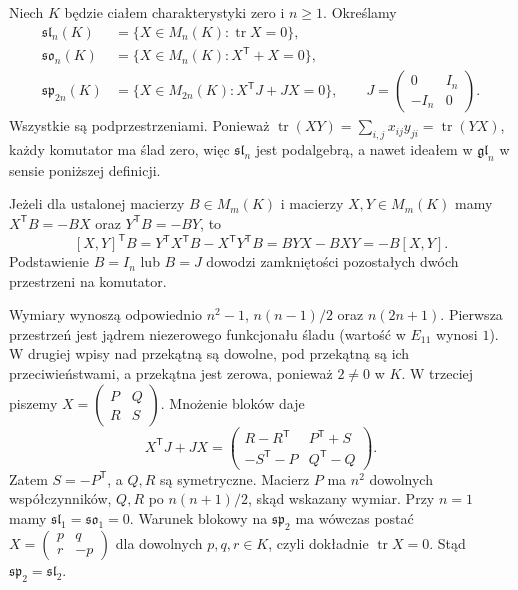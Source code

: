 \begin{przyklad}
\label{aa:prz:classical-lie}
Niech $K$ będzie ciałem charakterystyki zero
i $n\ge1$. Określamy
\[
\begin{aligned}
 \mathfrak{sl}_n(K)&=\{X\in M_n(K):\operatorname{tr}X=0\},\\
 \mathfrak{so}_n(K)&=\{X\in M_n(K):X^{\mathsf T}+X=0\},\\
 \mathfrak{sp}_{2n}(K)&=\{X\in M_{2n}(K):X^{\mathsf T}J+JX=0\},
 \qquad J=\begin{pmatrix}0&I_n\\-I_n&0\end{pmatrix}.
\end{aligned}
\]
Wszystkie są podprzestrzeniami. Ponieważ
$\operatorname{tr}(XY)=\sum_{i,j}x_{ij}y_{ji}
=\operatorname{tr}(YX)$, każdy komutator ma ślad zero,
więc $\mathfrak{sl}_n$ jest podalgebrą, a nawet
ideałem w $\mathfrak{gl}_n$ w sensie poniższej definicji.

Jeżeli dla ustalonej macierzy $B\in M_m(K)$ i macierzy
$X,Y\in M_m(K)$ mamy $X^{\mathsf T}B=-BX$ oraz
$Y^{\mathsf T}B=-BY$, to
\[
 [X,Y]^{\mathsf T}B
 =Y^{\mathsf T}X^{\mathsf T}B-X^{\mathsf T}Y^{\mathsf T}B
 =BYX-BXY=-B[X,Y].
\]
Podstawienie $B=I_n$ lub $B=J$ dowodzi zamkniętości
pozostałych dwóch przestrzeni na komutator.

Wymiary wynoszą odpowiednio $n^2-1$, $n(n-1)/2$
oraz $n(2n+1)$. Pierwsza przestrzeń jest jądrem
niezerowego funkcjonału śladu (wartość w $E_{11}$
wynosi $1$). W drugiej wpisy nad przekątną są dowolne,
pod przekątną są ich przeciwieństwami, a przekątna
jest zerowa, ponieważ $2\ne0$ w $K$.
W trzeciej piszemy $X=\begin{pmatrix}P&Q\\R&S\end{pmatrix}$.
Mnożenie bloków daje
\[
 X^{\mathsf T}J+JX
 =\begin{pmatrix}R-R^{\mathsf T}&P^{\mathsf T}+S\\
 -S^{\mathsf T}-P&Q^{\mathsf T}-Q\end{pmatrix}.
\]
Zatem $S=-P^{\mathsf T}$, a $Q,R$ są symetryczne.
Macierz $P$ ma $n^2$ dowolnych współczynników,
$Q,R$ po $n(n+1)/2$, skąd wskazany wymiar.
Przy $n=1$ mamy $\mathfrak{sl}_1=\mathfrak{so}_1=0$.
Warunek blokowy na $\mathfrak{sp}_2$ ma wówczas postać
$X=\begin{pmatrix}p&q\\r&-p\end{pmatrix}$ dla dowolnych
$p,q,r\in K$, czyli dokładnie $\operatorname{tr}X=0$.
Stąd $\mathfrak{sp}_2=\mathfrak{sl}_2$.
\end{przyklad}

